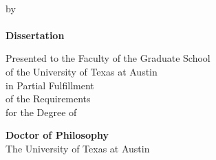 \begin{titlepage}
\makeatletter
{}
\vspace*{\fill}
\begin{center}
\textbf{
\large
\@title
} \\
\vspace{1cm}
by \\
\vspace{1cm}
\textbf{
\@author
} \\
\vspace{1cm}
\textbf{Dissertation}
\vspace{1cm}

Presented to the Faculty of the Graduate School\\
of the University of Texas at Austin \\
in Partial Fulfillment \\
of the Requirements \\
for the Degree of \\
\vspace{1cm}

\textbf{Doctor of Philosophy} \\
\vspace{1cm}
The University of Texas at Austin \\
\lastmonthofsemester \space \theyear
\end{center}
\vspace*{\fill}

\end{titlepage}

